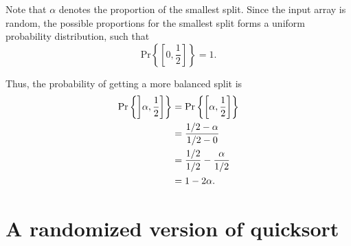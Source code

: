 \begin{enumerate}
\begin{framed}
Note that $\alpha$ denotes the proportion of the smallest split. Since the input
array is random, the possible proportions for the smallest split forms a uniform
probability distribution, such that
\[
  \text{Pr}\left\{\left[0, \frac{1}{2}\right]\right\} = 1.
\]

Thus, the probability of getting a more balanced split is
\begin{equation*}
\begin{aligned}
  \text{Pr}\left\{\interval[open left, scaled]{\alpha}{\frac{1}{2}}\right\}
  &= \text{Pr}\left\{\interval[scaled]{\alpha}{\frac{1}{2}}\right\}\\
  &= \frac{1/2 - \alpha}{1/2 - 0}\\
  &= \frac{1/2}{1/2} - \frac{\alpha}{1/2}\\
  &= 1 - 2 \alpha.
\end{aligned}
\end{equation*}
\end{framed}

\end{enumerate}

\newpage

\section{A randomized version of quicksort}

